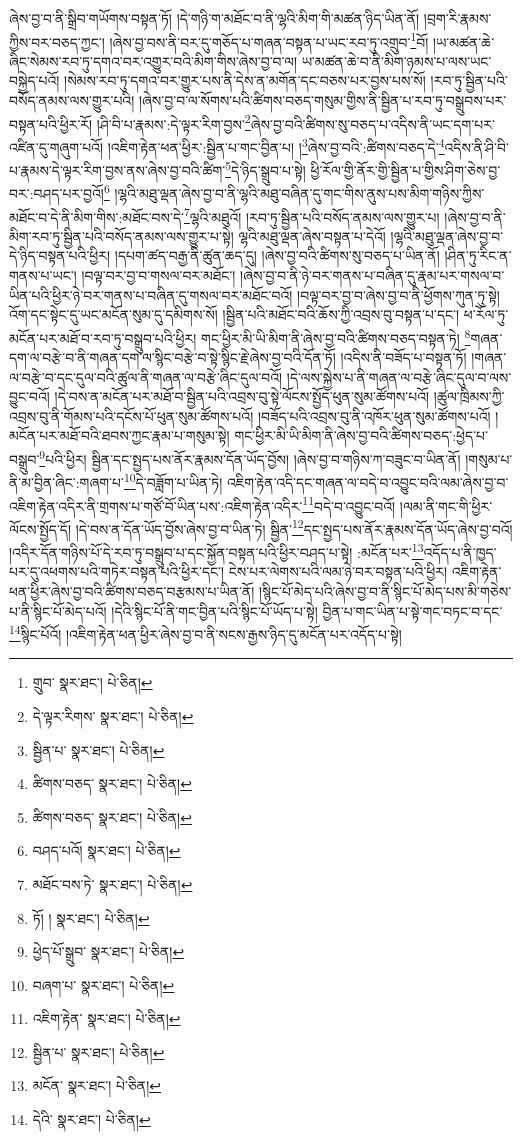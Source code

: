 ཞེས་བྱ་བ་ནི་སྒྲིབ་གཡོགས་བསྟན་ཏོ། །དེ་གཉི་ག་མཐོང་བ་ནི་ལྷའི་མིག་གི་མཚན་ཉིད་ཡིན་ནོ། །བྲག་རི་རྣམས་ཀྱིས་བར་བཅད་ཀྱང་། །ཞེས་བྱ་བས་ནི་བར་དུ་གཅོད་པ་གཞན་བསྟན་པ་ཡང་རབ་ཏུ་འགྲུབ་\footnote{གྲུབ་  སྣར་ཐང་།  པེ་ཅིན། }བོ། །ཡ་མཚན་ཆེ་ཞིང་སེམས་རབ་ཏུ་དགའ་བར་འགྱུར་བའི་མིག་གིས་ཞེས་བྱ་བ་ལ། ཡ་མཚན་ཆེ་བ་ནི་མིག་ཉམས་པ་ལས་ཡང་བསྐྱེད་པའོ། །སེམས་རབ་ཏུ་དགའ་བར་གྱུར་པས་ནི་དེས་ན་མགོན་དང་བཅས་པར་བྱས་པས་སོ། །རབ་ཏུ་སྦྱིན་པའི་བསོད་ནམས་ལས་གྱུར་པའི། །ཞེས་བྱ་བ་ལ་སོགས་པའི་ཚིགས་བཅད་གསུམ་གྱིས་ནི་སྦྱིན་པ་རབ་ཏུ་བསྒྲུབས་པར་བསྟན་པའི་ཕྱིར་རོ། །ཤི་བི་པ་རྣམས་:དེ་ལྟར་རིག་བྱས་\footnote{དེ་ལྟར་རིགས་  སྣར་ཐང་།  པེ་ཅིན། }ཞེས་བྱ་བའི་ཚིགས་སུ་བཅད་པ་འདིས་ནི་ཡང་དག་པར་འཛིན་དུ་གཞུག་པའོ། །འཇིག་རྟེན་ཕན་ཕྱིར་:སྦྱིན་པ་གང་བྱིན་པ། །\footnote{སྦྱིན་པ་  སྣར་ཐང་།  པེ་ཅིན། }ཞེས་བྱ་བའི་:ཚིགས་བཅད་དེ་\footnote{ཚིགས་བཅད་  སྣར་ཐང་།  པེ་ཅིན། }འདིས་ནི་ཤི་བི་པ་རྣམས་དེ་ལྟར་རིག་བྱས་ནས་ཞེས་བྱ་བའི་ཚིག་\footnote{ཚིགས་བཅད་  སྣར་ཐང་།  པེ་ཅིན། }དེ་ཉིད་སྒྲུབ་པ་སྟེ། ཕྱི་རོལ་གྱི་ནོར་གྱི་སྦྱིན་པ་གྱིས་ཤིག་ཅེས་བྱ་བར་:བཤད་པར་བྱའོ།\footnote{བཤད་པའོ།  སྣར་ཐང་།  པེ་ཅིན། } །ལྷའི་མཐུ་ལྡན་ཞེས་བྱ་བ་ནི་ལྷའི་མཐུ་བཞིན་དུ་གང་གིས་ནུས་པས་མིག་གཉིས་ཀྱིས་མཐོང་བ་དེ་ནི་མིག་གིས་:མཐོང་བས་དེ་\footnote{མཐོང་བས་ཏེ་  སྣར་ཐང་།  པེ་ཅིན། }ལྷའི་མཐུའོ། །རབ་ཏུ་སྦྱིན་པའི་བསོད་ནམས་ལས་གྱུར་པ། །ཞེས་བྱ་བ་ནི་མིག་རབ་ཏུ་སྦྱིན་པའི་བསོད་ནམས་ལས་གྱུར་པ་སྟེ། ལྷའི་མཐུ་ལྡན་ཞེས་བསྟན་པ་དེའོ། །ལྷའི་མཐུ་ལྡན་ཞེས་བྱ་བ་དེ་ཉིད་བསྟན་པའི་ཕྱིར། །དཔག་ཚད་བརྒྱ་ནི་ཚུན་ཆད་དུ། །ཞེས་བྱ་བའི་ཚིགས་སུ་བཅད་པ་ཡིན་ནོ། །ཤིན་ཏུ་རིང་ན་གནས་པ་ཡང་། །བལྟ་བར་བྱ་བ་གསལ་བར་མཐོང་། །ཞེས་བྱ་བ་ནི་ཉེ་བར་གནས་པ་བཞིན་དུ་རྣམ་པར་གསལ་བ་ཡིན་པའི་ཕྱིར་ཉེ་བར་གནས་པ་བཞིན་དུ་གསལ་བར་མཐོང་བའོ། །བལྟ་བར་བྱ་བ་ཞེས་བྱ་བ་ནི་ཕྱོགས་ཀུན་ཏུ་སྟེ། འོག་དང་སྟེང་དུ་ཡང་མངོན་སུམ་དུ་དམིགས་སོ། །སྦྱིན་པའི་མཐོང་བའི་ཆོས་ཀྱི་འབྲས་བུ་བསྟན་པ་དང་། ཕ་རོལ་ཏུ་མངོན་པར་མཐོ་བ་རབ་ཏུ་བསྒྲུབ་པའི་ཕྱིར། གང་ཕྱིར་མི་ཡི་མིག་ནི་ཞེས་བྱ་བའི་ཚིགས་བཅད་བསྟན་ཏེ། \footnote{ཏོ། །   སྣར་ཐང་།  པེ་ཅིན། }གཞན་དག་ལ་བརྩེ་བ་ནི་གཞན་དག་ལ་སྙིང་བརྩེ་བ་སྟེ་སྙིང་རྗེ་ཞེས་བྱ་བའི་དོན་ཏོ། །འདིས་ནི་བཟོད་པ་བསྟན་ཏོ། །གཞན་ལ་བརྩེ་བ་དང་དུལ་བའི་ཚུལ་ནི་གཞན་ལ་བརྩེ་ཞིང་དུལ་བའོ། །དེ་ལས་སྐྱེས་པ་ནི་གཞན་ལ་བརྩེ་ཞིང་དུལ་བ་ལས་བྱུང་བའོ། །དེ་བས་ན་མངོན་པར་མཐོ་བ་སྦྱིན་པའི་འབྲས་བུ་སྟེ་ལོངས་སྤྱོད་ཕུན་སུམ་ཚོགས་པའོ། །ཚུལ་ཁྲིམས་ཀྱི་འབྲས་བུ་ནི་གོམས་པའི་དངོས་པོ་ཕུན་སུམ་ཚོགས་པའོ། །བཟོད་པའི་འབྲས་བུ་ནི་འཁོར་ཕུན་སུམ་ཚོགས་པའོ། །མངོན་པར་མཐོ་བའི་ཐབས་ཀྱང་རྣམ་པ་གསུམ་སྟེ། གང་ཕྱིར་མི་ཡི་མིག་ནི་ཞེས་བྱ་བའི་ཚིགས་བཅད་:ཕྱེད་པ་བསྒྲུབ་\footnote{ཕྱེད་པོ་སྒྲུབ་  སྣར་ཐང་།  པེ་ཅིན། }པའི་ཕྱིར། སྦྱིན་དང་སྤྱད་པས་ནོར་རྣམས་དོན་ཡོད་བྱོས། །ཞེས་བྱ་བ་གཉིས་ཀ་བཟུང་བ་ཡིན་ནོ། །གསུམ་པ་ནི་མ་བྱིན་ཞིང་:གཞག་པ་\footnote{བཞག་པ་  སྣར་ཐང་།  པེ་ཅིན། }དེ་བཟློག་པ་ཡིན་ཏེ། འཇིག་རྟེན་འདི་དང་གཞན་ལ་བདེ་བ་འབྱུང་བའི་ལམ་ཞེས་བྱ་བ་འཇིག་རྟེན་འདིར་ནི་གྲགས་པ་གཙོ་བོ་ཡིན་པས་:འཇིག་རྟེན་འདིར་\footnote{འཇིག་རྟེན་  སྣར་ཐང་།  པེ་ཅིན། }བདེ་བ་འབྱུང་བའོ། །ལམ་ནི་གང་གི་ཕྱིར་ལོངས་སྤྱོད་དོ། །དེ་བས་ན་དོན་ཡོད་བྱོས་ཞེས་བྱ་བ་ཡིན་ཏེ། སྦྱིན་\footnote{སྦྱིན་པ་  སྣར་ཐང་།  པེ་ཅིན། }དང་སྤྱད་པས་ནོར་རྣམས་དོན་ཡོད་ཞེས་བྱ་བའོ། །འདིར་དོན་གཉིས་པོ་དེ་རབ་ཏུ་བསྒྲུབ་པ་དང་སྐྱོན་བསྟན་པའི་ཕྱིར་བཤད་པ་སྟེ། :མངོན་པར་\footnote{མངོན་  སྣར་ཐང་།  པེ་ཅིན། }འདོད་པ་ནི་ཁྱད་པར་དུ་འཕགས་པའི་གཏེར་བསྟན་པའི་ཕྱིར་དང་། ངེས་པར་ལེགས་པའི་ལམ་ཉེ་བར་བསྟན་པའི་ཕྱིར། འཇིག་རྟེན་ཕན་ཕྱིར་ཞེས་བྱ་བའི་ཚིགས་བཅད་བརྩམས་པ་ཡིན་ནོ། །སྙིང་པོ་མེད་པའི་ཞེས་བྱ་བ་ནི་སྙིང་པོ་མེད་པས་མི་གཅེས་པ་ནི་སྙིང་པོ་མེད་པའོ། །དེའི་སྙིང་པོ་ནི་གང་བྱིན་པའི་སྙིང་པོ་ཡོད་པ་སྟེ། བྱིན་པ་གང་ཡིན་པ་སྟེ་གང་བཏང་བ་དང་\footnote{དེའི་  སྣར་ཐང་།  པེ་ཅིན། }སྙིང་པོའོ། །འཇིག་རྟེན་ཕན་ཕྱིར་ཞེས་བྱ་བ་ནི་སངས་རྒྱས་ཉིད་དུ་མངོན་པར་འདོད་པ་སྟེ། 